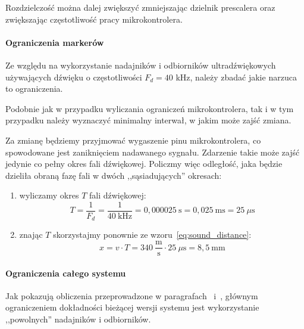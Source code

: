 Rozdzielczość można dalej zwiększyć zmniejszając dzielnik prescalera  oraz zwiększając częstotliwość pracy mikrokontrolera.

\paragraph{Ograniczenia markerów}
\label{section:sound_limit}

Ze względu na wykorzystanie nadajników i odbiorników ultradźwiękowych używających dźwięku o częstotliwości $F_{d} = 40$ kHz, należy zbadać jakie narzuca to ograniczenia.

Podobnie jak w przypadku wyliczania ograniczeń mikrokontrolera, tak i w tym przypadku należy wyznaczyć minimalny interwał, w jakim może zajść zmiana.

Za zmianę będziemy przyjmować wygaszenie pinu mikrokontrolera, co spowodowane jest zaniknięciem nadawanego sygnału. Zdarzenie takie może zajść jedynie co pełny okres fali dźwiękowej. Policzmy więc odległość, jaka będzie dzieliła obraną fazę fali w dwóch ,,sąsiadujących'' okresach:

\begin{enumerate}
 \item wyliczamy okres $T$ fali dźwiękowej:
    \begin{equation}
      T = \frac{1}{F_d} = \frac{1}{40~\textrm{kHz}} = 0,000025~\textrm{s} = 0,025~\textrm{ms} = 25~\mu\textrm{s}
    \end{equation}
 \item znając $T$ skorzystajmy ponownie ze wzoru~\ref{eq:sound_distance}:
    \begin{equation}
      x = v \cdot T = 340~\frac{\textrm{m}}{\textrm{s}} \cdot 25~\mu\textrm{s} = 8,5~\textrm{mm}
      \label{eq:sound_limit}
    \end{equation}
\end{enumerate}

\paragraph{Ograniczenia całego systemu}
Jak pokazują obliczenia przeprowadzone w paragrafach~ i~, głównym ograniczeniem dokładności bieżącej wersji systemu jest wykorzystanie ,,powolnych'' nadajników i odbiorników.

